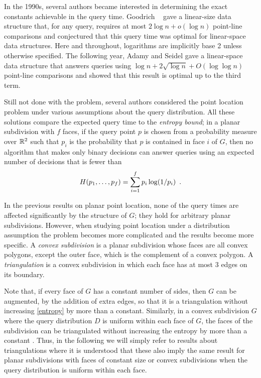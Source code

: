 \documentclass[charterfonts,lotsofwhite]{patmorin}
\begin{document}
In the 1990s, several authors became interested in determining the
exact constants achievable in the query time.  Goodrich \etal\
\cite{gor97} gave a linear-size data structure that, for any query,
requires at most $2\log n + o(\log n)$ point-line comparisons and
conjectured that this query time was optimal for linear-space data
structures. Here and throughout, logarithms are implicitly base 2
unless otherwise specified. The following year, Adamy and Seidel
\cite{as98} gave a linear-space data structure that answers queries
using $\log n + 2\sqrt{\log n} + O(\log\log n)$ point-line comparisons
and showed that this result is optimal up to the third term.

Still not done with the problem, several authors considered the point
location problem under various assumptions about the query
distribution.  All these solutions compare the expected query time to
the \emph{entropy bound};  in a planar subdivision with $f$ faces, if the query
point $p$ is chosen from a probability measure over $\mathbb{R}^2$ such that
$p_i$ is the probability that $p$ is contained in face $i$ of $G$,
then no algorithm that makes only binary decisions can answer queries
using an expected number of decisions that is fewer than 
\begin{equation}
    H(p_1,\ldots,p_f) = \sum_{i=1}^f p_i\log(1/p_i) \enspace . 
	\eqlabel{entropy}
	\eqlabel{entropy-face}
\end{equation}

In the previous results on planar point location, none of the query
times are affected significantly by the structure of $G$;  they hold
for arbitrary planar subdivisions.  However, when studying point
location under a distribution assumption the problem becomes more
complicated and the results become more specific.  A \emph{convex
subdivision} is a planar subdivision whose faces are all convex
polygons, except the outer face, which is the complement of a convex
polygon.  A \emph{triangulation} is a convex subdivision in which each
face has at most 3 edges on its boundary.

Note that, if every face of $G$ has a constant number of sides, then
$G$ can be augmented, by the addition of extra edges, so that it is a
triangulation without increasing \eqref{entropy} by more than a
constant.  Similarly, in a convex subdivision $G$ where the query
distribution $D$ is uniform within each face of $G$, the faces of the
subdivision can be triangulated without increasing the entropy by more
than a constant \cite{amm00}. Thus, in the following we will simply
refer to results about triangulations where it is understood that
these also imply the same result for planar subdivisions with faces of
constant size or convex subdivisions when the query distribution is
uniform within each face.
\end{document}
